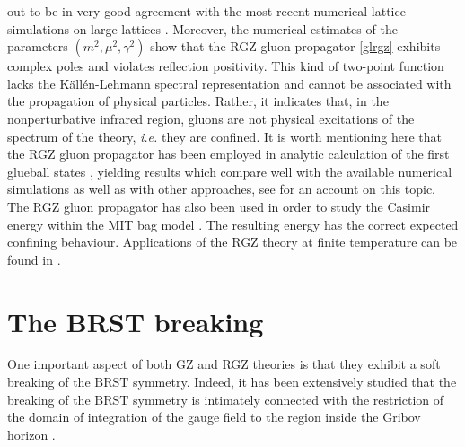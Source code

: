 out to be in very good agreement with the most recent  numerical lattice simulations on large
lattices \cite{Cucchieri:2007rg,Cucchieri:2008fc,Cucchieri:2011ig}. Moreover, the numerical
estimates  \cite{Cucchieri:2011ig}  of the parameters $(m^2,\mu^2,\gamma^2)$ show that the RGZ
gluon propagator \eqref{glrgz} exhibits complex poles and violates  reflection positivity. This
kind of two-point function lacks the  K{\"a}ll{\'e}n-Lehmann spectral representation and cannot
be associated with the propagation of physical particles. Rather, it indicates that, in the
nonperturbative infrared region, gluons are not physical excitations of the spectrum of the
theory, {\it i.e.} they are confined.  It is worth mentioning here that the RGZ gluon
propagator has been employed in analytic calculation of the first glueball states
\cite{Dudal:2010cd,Dudal:2013wja}, yielding results which compare well with the available
numerical simulations as well as with other approaches, see \cite{Mathieu:2008me} for an
account on this topic. The RGZ gluon propagator has also been used in order to  study the
Casimir energy within the MIT bag model \cite{Canfora:2013zna}. The resulting energy has the
correct expected confining behaviour. Applications  of the RGZ theory at finite temperature can
be found in  \cite{Fukushima:2013xsa,Canfora:2013kma}. 










\section{The BRST breaking}

One important aspect of both GZ and RGZ theories is that they exhibit a soft breaking of the
BRST symmetry. Indeed, it has been extensively studied that the breaking of the BRST symmetry
is intimately connected with the restriction of the domain of integration of the gauge field to
the region inside the Gribov horizon
\cite{Baulieu:2008fy,Zwanziger:2009je,Sorella:2009vt,Zwanziger:1993dh,vonSmekal:2008en,Dudal:2010hj,Dudal:2009xh,Sorella:2010it,Capri:2010hb,Dudal:2012sb,Reshetnyak:2013bga}.


